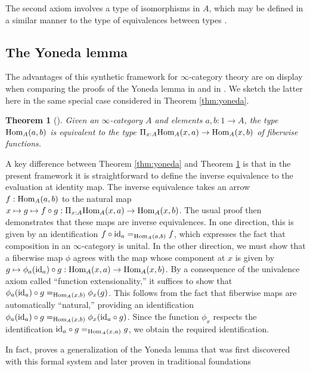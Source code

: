 \documentclass[11pt]{ctexart}
\newtheorem{thm}{Theorem}[section]
\theoremstyle{definition}
\theoremstyle{remark}
\numberwithin{equation}{section}
\newcommand{\id}{\textup{id}}
\newcommand{\Hom}{\textup{Hom}}
\newcommand{\1}{\mathbbe{1}}
\newcommand{\2}{\mathbbe{2}}
\newcommand{\3}{\mathbbe{3}}
\begin{document}
The second axiom involves a type of isomorphisms in $A$, which may be defined in a similar manner to the type of equivalences between types \cite[\S 10]{RS}.

\subsection*{The Yoneda lemma}

The advantages of this synthetic framework for $\infty$-category theory are on display when comparing the proofs of the Yoneda lemma in \cite[5.7.1]{RV} and in \cite[9.1]{RS}. We sketch the latter here in the same special case considered in Theorem \ref{thm:yoneda}.


\begin{thm}[{\cite[9.1]{RS}}]\label{thm:yoneda-again} 
    Given an $\infty$-category $A$ and elements $a,b \colon 1 \to A$, the type $\Hom_A(a,b)$ is equivalent to the type $\Pi_{x :A} \Hom_A(x,a) \to \Hom_A(x,b)$ of fiberwise functions.
\end{thm}

A key difference between Theorem \ref{thm:yoneda} and Theorem \ref{thm:yoneda-again} is that in the present framework it is straightforward to define the inverse equivalence to the evaluation at identity map. The inverse equivalence takes an arrow $f: \Hom_A(a,b)$ to the natural map $x \mapsto g \mapsto f \circ g : \Pi_{x:A} \Hom_A(x,a) \to \Hom_A(x,b)$. The usual proof then demonstrates that these maps are inverse equivalences. In one direction, this is given by an identification $f \circ \id_a =_{\Hom_A(a,b)} f$, which expresses the fact that composition in an $\infty$-category is unital. In the other direction, we must show that a fiberwise map $\phi$ agrees with the map whose component at $x$ is given by $g \mapsto  \phi_a(\id_a) \circ g: \Hom_A(x,a) \to \Hom_A(x,b)$. By a consequence of the univalence axiom called ``function extensionality,'' it suffices to show that $\phi_a(\id_a) \circ g =_{\Hom_A(x,b)} \phi_x(g)$. This follows from the fact that fiberwise maps are automatically ``natural,'' providing an identification $\phi_a(\id_a) \circ g =_{\Hom_A(x,b)} \phi_x(\id_a \circ g)$. Since the function $\phi_x$ respects the identification $\id_a \circ g =_{\Hom_A(x,a)} g$, we obtain the required identification.

In fact, \cite[9.5]{RS} proves a generalization of the Yoneda lemma  that was first discovered with this formal system and later proven in traditional foundations \cite[5.7.2]{RV}
\end{document}
